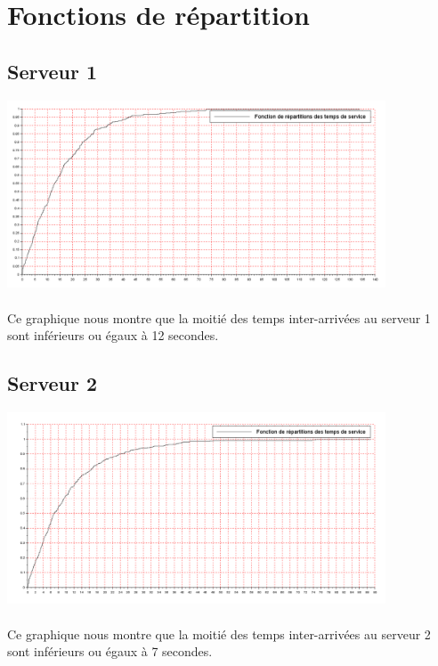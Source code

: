 \documentclass{article}
\begin{document}
\section{Fonctions de répartition}

\subsection{Serveur 1}
\begin{center}
\includegraphics[width=425px]{img/S1_repart.png}
\end{center}
\paragraph{}
Ce graphique nous montre que la moitié des temps inter-arrivées au serveur 1 sont inférieurs ou égaux à 12 secondes.

\subsection{Serveur 2}
\begin{center}
\includegraphics[width=425px]{img/S2_repart.png}
\end{center}
\paragraph{}
Ce graphique nous montre que la moitié des temps inter-arrivées au serveur 2 sont inférieurs ou égaux à 7 secondes.
\end{document}
